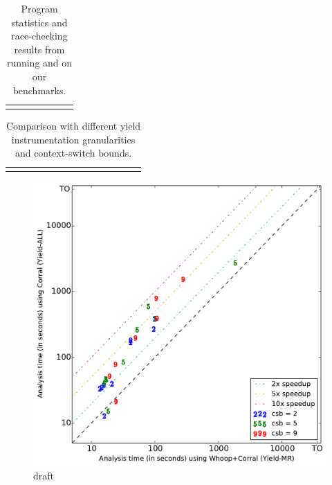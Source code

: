 \newcommand{\colspacing}{\hspace{1.8em}}
\begin{table}[t]
\small
\centering
\setlength{\tabcolsep}{0.3em}
\caption{Program statistics and race-checking results from running \whoop and \corral on our benchmarks.}
\label{tab:stats}
\begin{tabular}{l rrr rr r}
\centering

\end{tabular}
\end{table}

\begin{table}[t]
\small
\centering
\setlength{\tabcolsep}{0.45em}
\caption{Comparison with different yield instrumentation granularities and context-switch bounds.}
\label{tab:results}
\begin{tabular}{l r rrrr rrrr rrrr}
\centering

\end{tabular}
\end{table}

\begin{figure}
\centering
\includegraphics[width=.99\linewidth]{experiments/figures/yieldmr_vs_yieldall.pdf}
\caption{draft}
\label{fig:plot1}
\end{figure}

